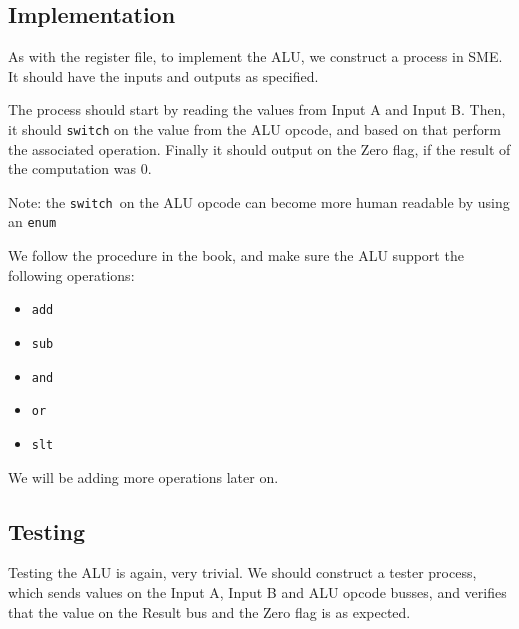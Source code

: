 \documentclass{beamer}
\begin{document}
\subsection{Implementation}
\begin{frame}
    As with the register file, to implement the ALU, we construct a process in
    SME. It should have the inputs and outputs as specified.

    \vspace{\baselineskip}
    The process should start by reading the values from Input A and Input B.
    Then, it should \texttt{switch} on the value from the ALU opcode, and based
    on that perform the associated operation. Finally it should output on the
    Zero flag, if the result of the computation was 0.

    \vspace{\baselineskip}
    Note: the \texttt{switch} on the ALU opcode can become more human readable
    by using an \texttt{enum}
\end{frame}
\begin{frame}
    We follow the procedure in the book, and make sure the ALU support the
    following operations:
    \begin{itemize}
        \item \texttt{add}
        \item \texttt{sub}
        \item \texttt{and}
        \item \texttt{or}
        \item \texttt{slt}
    \end{itemize}
    We will be adding more operations later on.
\end{frame}
\subsection{Testing}
\begin{frame}
    Testing the ALU is again, very trivial. We should construct a tester
    process, which sends values on the Input A, Input B and ALU opcode busses,
    and verifies that the value on the Result bus and the Zero flag is as
    expected.
\end{frame}
\end{document}

